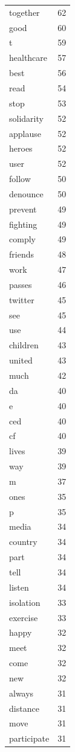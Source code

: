 \begin{tabular}{lr}
together & 62 \\
good & 60 \\
t & 59 \\
healthcare & 57 \\
best & 56 \\
read & 54 \\
stop & 53 \\
solidarity & 52 \\
applause & 52 \\
heroes & 52 \\
user & 52 \\
follow & 50 \\
denounce & 50 \\
prevent & 49 \\
fighting & 49 \\
comply & 49 \\
friends & 48 \\
work & 47 \\
passes & 46 \\
twitter & 45 \\
see & 45 \\
use & 44 \\
children & 43 \\
united & 43 \\
much & 42 \\
da & 40 \\
e & 40 \\
ced & 40 \\
cf & 40 \\
lives & 39 \\
way & 39 \\
m & 37 \\
ones & 35 \\
p & 35 \\
media & 34 \\
country & 34 \\
part & 34 \\
tell & 34 \\
listen & 34 \\
isolation & 33 \\
exercise & 33 \\
happy & 32 \\
meet & 32 \\
come & 32 \\
new & 32 \\
always & 31 \\
distance & 31 \\
move & 31 \\
participate & 31 \\

\end{tabular}
